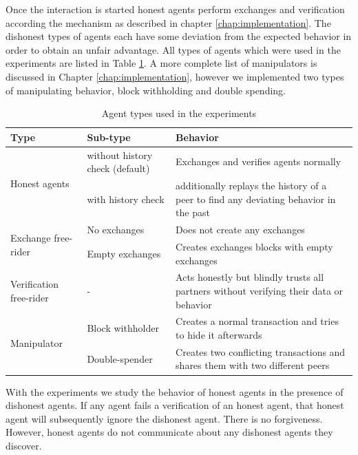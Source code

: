 Once the interaction is started honest agents perform exchanges and verification according the 
mechanism as described in chapter \ref{chap:implementation}. The dishonest types of agents each have 
some deviation from the expected behavior in order to obtain an unfair advantage. 
All types of agents which were used in the experiments are listed in Table \ref{tab:agent_types}.
A more complete list of manipulators is discussed in Chapter \ref{chap:implementation}, however we 
implemented two types of manipulating behavior, block withholding and double spending.

\begin{table}
    \caption{Agent types used in the experiments}
    \label{tab:agent_types}
    \begin{tabular}{p{3cm}|p{3cm}|p{8cm}} \toprule
    \textbf{Type} & \textbf{Sub-type} & \textbf{Behavior} \\ \midrule
    \multirow{2}{3cm}{Honest agents} & without history check (default) & Exchanges and verifies agents normally \\ \cline{2-3}
    & with history check & additionally replays the history of a peer to find any deviating behavior in the past \\ \midrule
    \multirow{2}{3cm}{Exchange free-rider} & No exchanges & Does not create any exchanges \\ \cline{2-3}
    & Empty exchanges & Creates exchanges blocks with empty exchanges \\ 
    \midrule
    Verification free-rider & - & Acts honestly but blindly trusts all partners without verifying their data or behavior \\ \midrule
    \multirow{2}{3cm}{Manipulator } & Block withholder & Creates a normal transaction and tries to hide it afterwards \\ \cline{2-3}
    & Double-spender & Creates two conflicting transactions and shares them with two different peers \\ \bottomrule
    \end{tabular}
\end{table}
    
With the experiments we study the behavior of honest agents in the presence of dishonest agents. If 
any agent fails a verification of an honest agent, that honest agent will subsequently ignore the 
dishonest agent. There is no forgiveness. However, honest agents do not communicate about any 
dishonest agents they discover.


